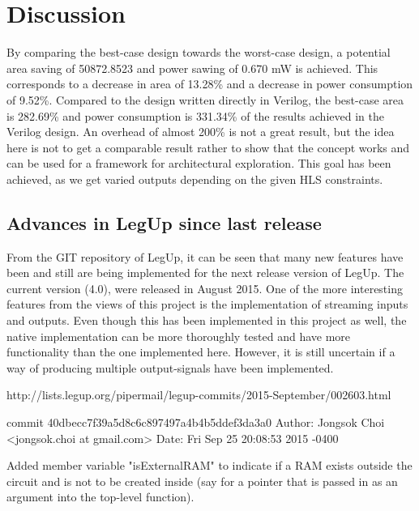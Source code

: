 \chapter{Discussion}

By comparing the best-case design towards the worst-case design, a potential area saving of 50872.8523 and power sawing of 0.670 mW is achieved. This corresponds to a decrease in area of 13.28\% and a decrease in power consumption of 9.52\%. Compared to the design written directly in Verilog, the best-case area is 282.69\% and power consumption is 331.34\% of the results achieved in the Verilog design. An overhead of almost 200\% is not a great result, but the idea here is not to get a comparable result rather to show that the concept works and can be used for a framework for architectural exploration. This goal has been achieved, as we get varied outputs depending on the given HLS constraints.

\section{Advances in LegUp since last release}
From the GIT repository of LegUp, it can be seen that many new features have been and still are being implemented for the next release version of LegUp. The current version (4.0), were released in August 2015. One of the more interesting features from the views of this project is the implementation of streaming inputs and outputs. Even though this has been implemented in this project as well, the native implementation can be more thoroughly tested and have more functionality than the one implemented here. However, it is still uncertain if a way of producing multiple output-signals have been implemented.

http://lists.legup.org/pipermail/legup-commits/2015-September/002603.html

commit 40dbecc7f39a5d8c6c897497a4b4b5ddef3da3a0
Author: Jongsok Choi <jongsok.choi at gmail.com>
Date:   Fri Sep 25 20:08:53 2015 -0400

    Added member variable "isExternalRAM" to indicate if a RAM exists
    outside the circuit and is not to be created inside (say for a pointer
    that is passed in as an argument into the top-level function).
    
